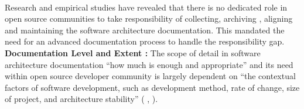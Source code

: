 \\\indent Research and empirical studies \cite{6923128} have revealed that there is no dedicated role in open source communities to take responsibility of collecting, archiving , aligning and maintaining the software architecture documentation. This mandated the need for an advanced documentation process to handle the responsibility gap.
\newline
\\\indent \textbf{Documentation Level and Extent : } The scope of detail in software architecture documentation \enquote{how much is enough and appropriate} and its need within open source developer community is largely dependent on \enquote{the contextual factors of software development, such as development method, rate of change, size of project, and architecture stability} (\cite{SMR:SMR572} , \cite{Briand2003}).
